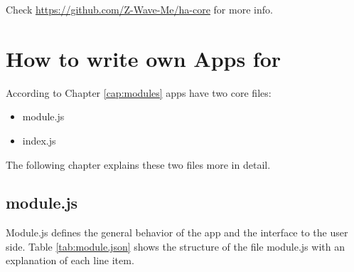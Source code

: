 Check \url{https://github.com/Z-Wave-Me/ha-core} for more info.


\section{How to write own Apps for \zway}
\label{developownapps}

According to Chapter \ref{cap:modules} apps have two core files:

\begin{itemize}
\item module.js
\item index.js
\end{itemize}

The following chapter explains these two files more in detail. 

\subsection{module.js}

Module.js defines the general behavior of the app and the interface to the user side.
Table \ref{tab:module.json} 
shows the structure of the file module.js with an explanation of each line item.

